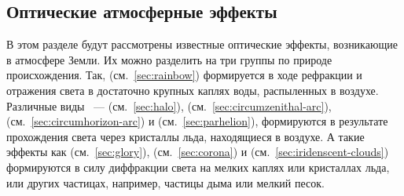 \subsection{Оптические атмосферные эффекты}

В этом разделе будут рассмотрены известные оптические эффекты, возникающие в атмосфере Земли. Их можно разделить на три группы по природе происхождения. Так,  (см.~\ref{sec:rainbow}) формируется в ходе рефракции и отражения света в достаточно крупных каплях воды, распыленных в воздухе. Различные виды ~---  (см.~\ref{sec:halo}),  (см.~\ref{sec:circumzenithal-arc}),  (см.~\ref{sec:circumhorizon-arc}) и  (см.~\ref{sec:parhelion}), формируются в результате прохождения света через кристаллы льда, находящиеся в воздухе. А такие эффекты как  (см.~\ref{sec:glory}),  (см.~\ref{sec:corona}) и  (см.~\ref{sec:iridenscent-clouds}) формируются в силу  диффракции света на мелких каплях или кристаллах льда, или других частицах, например, частицы дыма или мелкий песок.






